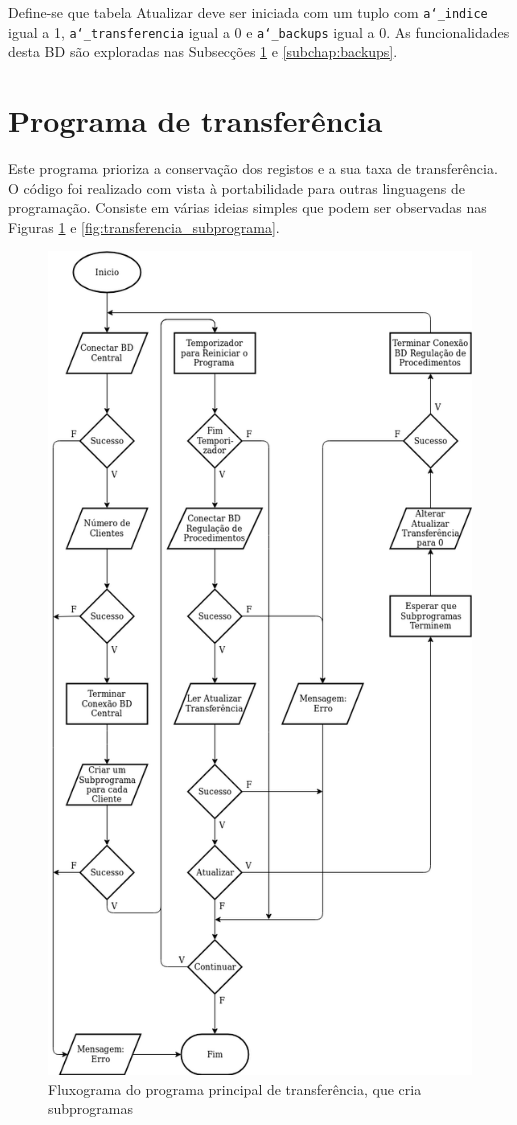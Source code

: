 \documentclass[11pt,twoside,a4paper]{report}
\begin{document}
Define-se que tabela Atualizar deve ser iniciada com um tuplo com \texttt{a\char`_indice} igual a 1, \texttt{a\char`_transferencia} igual a 0 e \texttt{a\char`_backups} igual a 0. As funcionalidades desta BD são exploradas nas Subsecções \ref{subchap:transferencia} e \ref{subchap:backups}.

\section{Programa de transferência}
\label{subchap:transferencia}
Este programa prioriza a conservação dos registos e a sua taxa de transferência. O código foi realizado com vista à portabilidade para outras linguagens de programação. Consiste em várias ideias simples que podem ser observadas nas Figuras \ref{fig:transferencia_programa} e \ref{fig:transferencia_subprograma}.\par 
\begin{figure}
	\vspace{-3cm}
	\begin{center}
		\includegraphics[width=.75\textwidth]{fluxograma_transferencia_programa4} %
		\caption[Fluxograma do programa principal de transferência]{Fluxograma do programa principal de transferência, que cria subprogramas}
		\label{fig:transferencia_programa}
	\end{center}
\end{figure}
\end{document}
